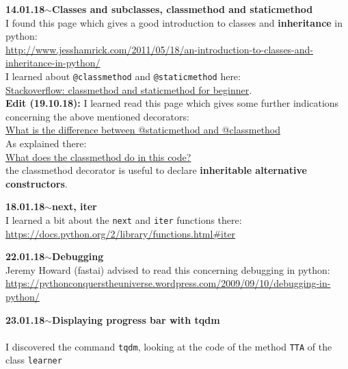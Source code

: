 \documentclass[11pt,a4paper]{article}
\newenvironment{loggentry}[2]%
{\noindent\textbf{#1}\hspace{1cm}$\mathbf{\sim}$\text{ }\textbf{#2}\\}{\vspace{0.5cm}}
\begin{document}
\begin{loggentry}{14.01.18}{Classes and subclasses, classmethod and staticmethod}
I found this page which gives a good introduction to classes and \textbf{inheritance} in python:\\
\url{http://www.jesshamrick.com/2011/05/18/an-introduction-to-classes-and-inheritance-in-python/}\\
I learned about \texttt{@classmethod} and \texttt{@staticmethod} here:\\
\href{https://stackoverflow.com/questions/12179271/meaning-of-classmethod-and-staticmethod-for-beginner}{Stackoverflow: classmethod and staticmethod for beginner}.\\
\textbf{Edit (19.10.18):} I learned read this page which gives some further indications concerning the above mentioned decorators:\\
\href{https://stackoverflow.com/questions/1950414/what-does-classmethod-do-in-this-code/1950927#1950927}{What is the difference between @staticmethod and @classmethod}\\
As explained there:\\
\href{https://stackoverflow.com/questions/1950414/what-does-classmethod-do-in-this-code/1950927#1950927}{What does the classmethod do in this code?}\\
the classmethod decorator is useful to declare \textbf{inheritable alternative constructors}.
\end{loggentry}

\begin{loggentry}{18.01.18}{next, iter}
I learned a bit about the \texttt{next} and \texttt{iter} functions there:\\
\url{https://docs.python.org/2/library/functions.html#iter}\\
\end{loggentry}

\begin{loggentry}{22.01.18}{Debugging}
Jeremy Howard (fastai) advised to read this concerning debugging in python:\\
\url{https://pythonconquerstheuniverse.wordpress.com/2009/09/10/debugging-in-python/}
\end{loggentry}

\begin{loggentry}{23.01.18}{Displaying progress bar with tqdm}\\
I discovered the command \texttt{tqdm}, looking at the code of the method \texttt{TTA} of the class \texttt{learner}
\end{loggentry}
\end{document}
